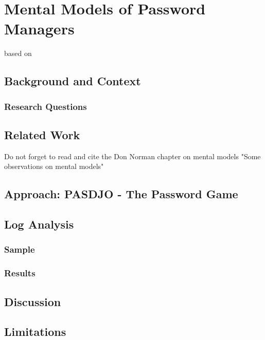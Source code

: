 \chapter[Mental Models of Password Managers]{Mental Models of Password Managers}\label{chap:mental_models_pwm}

based on \cite{Prinz2017MentalModel}

\section{Background and Context}


\subsection{Research Questions}

\section{Related Work}
Do not forget to read and cite the Don Norman chapter on mental models "Some observations on mental models"
\section{Approach: PASDJO - The Password Game}


\section{Log Analysis}

\subsection{Sample}
\subsection{Results}


\section{Discussion}


\section{Limitations}

